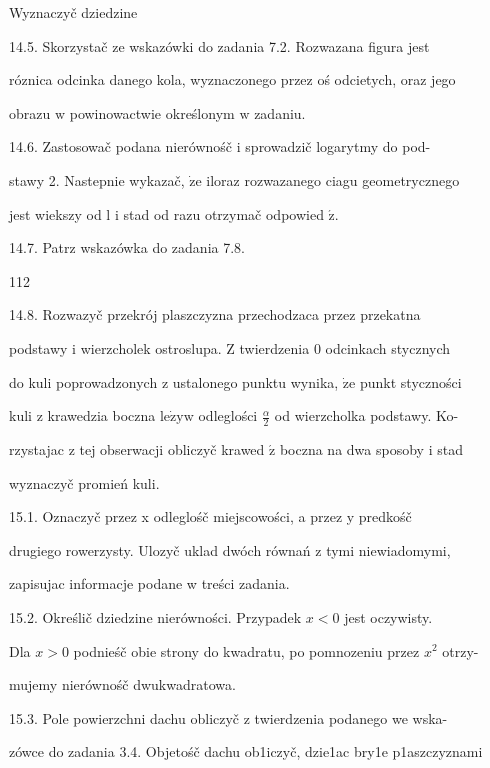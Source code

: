 \documentclass[a4paper,12pt]{article}
\begin{document}
Wyznaczyč dziedzine

14.5. Skorzystač ze wskazówki do zadania 7.2. Rozwazana figura jest

róznica odcinka danego kola, wyznaczonego przez oś odcietych, oraz jego

obrazu $\mathrm{w}$ powinowactwie określonym $\mathrm{w}$ zadaniu.

14.6. Zastosowač podana nierównośč $\mathrm{i}$ sprowadzič logarytmy do pod-

stawy 2. Nastepnie wykazač, $\dot{\mathrm{z}}\mathrm{e}$ iloraz rozwazanego ciagu geometrycznego

jest wiekszy od l $\mathrm{i}$ stad od razu otrzymač odpowied $\acute{\mathrm{z}}.$

14.7. Patrz wskazówka do zadania 7.8.





112

14.8. Rozwazyč przekrój plaszczyzna przechodzaca przez przekatna

podstawy $\mathrm{i}$ wierzcholek ostroslupa. $\mathrm{Z}$ twierdzenia $0$ odcinkach stycznych

do kuli poprowadzonych $\mathrm{z}$ ustalonego punktu wynika, $\dot{\mathrm{z}}\mathrm{e}$ punkt styczności

kuli $\mathrm{z}$ krawedzia boczna $\mathrm{l}\mathrm{e}\dot{\mathrm{z}}\mathrm{y}\mathrm{w}$ odleglości $\displaystyle \frac{\alpha}{2}$ od wierzcholka podstawy. Ko-

rzystajac $\mathrm{z}$ tej obserwacji obliczyč krawed $\acute{\mathrm{z}}$ boczna na dwa sposoby $\mathrm{i}$ stad

wyznaczyč promień kuli.

15.1. Oznaczyč przez x odleglośč miejscowości, a przez y predkośč

drugiego rowerzysty. Ulozyč uklad dwóch równań z tymi niewiadomymi,

zapisujac informacje podane w treści zadania.

15.2. Określič dziedzine nierówności. Przypadek $x<0$ jest oczywisty.

Dla $x>0$ podnieśč obie strony do kwadratu, po pomnozeniu przez $x^{2}$ otrzy-

mujemy nierównośč dwukwadratowa.

15.3. Pole powierzchni dachu obliczyč z twierdzenia podanego we wska-

zówce do zadania 3.4. Objetośč dachu ob1iczyč, dzie1ac bry1e p1aszczyznami
\end{document}
